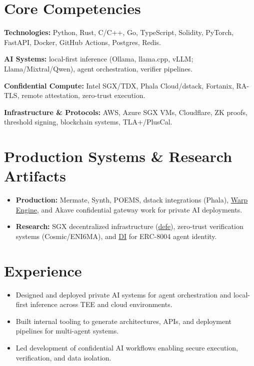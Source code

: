 \documentclass[10pt]{article}
\let\resumeoldtextbf\textbf
\renewcommand{\textbf}[1]{\textcolor{HighlightGray}{\resumeoldtextbf{#1}}}
\newcommand{\link}[2]{\href{#1}{\textcolor{TitleBlue}{#2}}}
\newcommand{\entry}[3]{%
  \noindent{\resumeoldtextbf{\textcolor{HighlightGray}{#1}} \hspace{0.35em} \textcolor{HighlightGray}{\emph{#2}} \hfill {\small\textcolor{HighlightGray}{#3}}}\par\vspace{-2pt}
}
\begin{document}
\section*{Core Competencies}
\small
\textbf{Technologies:} Python, Rust, C/C++, Go, TypeScript, Solidity, PyTorch, FastAPI, Docker, GitHub Actions, Postgres, Redis.\par
\textbf{AI Systems:} local-first inference (Ollama, llama.cpp, vLLM; Llama/Mixtral/Qwen), agent orchestration, verifier pipelines.\par
\textbf{Confidential Compute:} Intel SGX/TDX, Phala Cloud/dstack, Fortanix, RA-TLS, remote attestation, zero-trust execution.\par
\textbf{Infrastructure \& Protocols:} AWS, Azure SGX VMs, Cloudflare, ZK proofs, threshold signing, blockchain systems, TLA+/PlusCal.

\section*{Production Systems \& Research Artifacts}
\small
\begin{itemize}
  \item \textbf{Production:} Mermate, Synth, POEMS, dstack integrations (Phala), \link{https://github.com/DylanCkawalec/warp-engine}{Warp Engine}, and Akave confidential gateway work for private AI deployments.
  \item \textbf{Research:} SGX decentralized infrastructure (\link{https://github.com/osmosis-labs/defe}{defe}), zero-trust verification systems (Cosmic/ENI6MA), and \link{https://github.com/DylanCkawalec/DI}{DI} for ERC-8004 agent identity.
\end{itemize}

\section*{Experience}
\small
\entry{Head of AI, Decentralized Confidential Compute}{Jokuh (Independent R\&D)}{Dec 2025 -- Present}
\begin{itemize}
  \item Designed and deployed private AI systems for agent orchestration and local-first inference across TEE and cloud environments.
  \item Built internal tooling to generate architectures, APIs, and deployment pipelines for multi-agent systems.
  \item Led development of confidential AI workflows enabling secure execution, verification, and data isolation.
\end{itemize}
\end{document}
